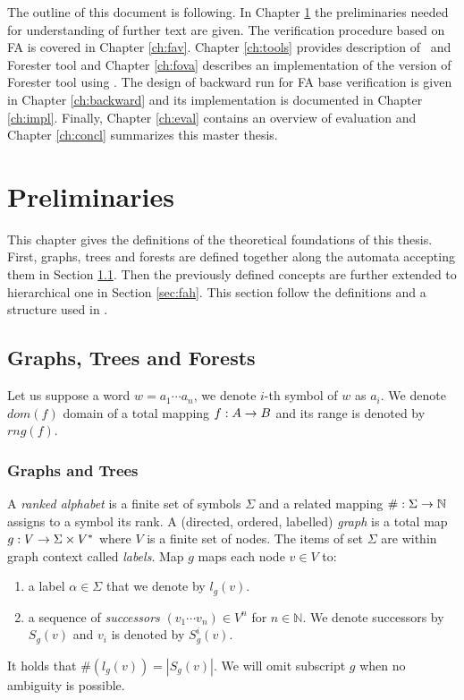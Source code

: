 The outline of this document is following.
In Chapter \ref{ch:prel} the preliminaries needed for understanding of further text are given.
The verification procedure based on FA is covered in Chapter \ref{ch:fav}.
Chapter \ref{ch:tools} provides description of \vata\ and Forester tool and Chapter \ref{ch:fova} describes an implementation of the version of Forester tool using \vata.
The design of backward run for FA base verification is given in Chapter \ref{ch:backward} and its implementation is documented
in Chapter \ref{ch:impl}.
Finally, Chapter \ref{ch:eval} contains an overview of evaluation and Chapter \ref{ch:concl} summarizes this master thesis.

\chapter{Preliminaries}
\label{ch:prel}

This chapter gives the definitions of the theoretical foundations of this thesis.
First, graphs, trees and forests are defined together along the automata accepting them in Section \ref{sec:graph}.
Then the previously defined concepts are further extended to hierarchical one in Section \ref{sec:fah}.
This section follow the definitions and a structure used in \cite{techrep}.

\section{Graphs, Trees and Forests}
\label{sec:graph}

Let us suppose a word $w = a_1 \cdots a_n$, we denote $i$-th symbol of $w$ as $a_i$.
We denote $dom(f)$ domain of a total mapping $f: A \rightarrow B$ and its range is denoted by $rng(f)$.

\subsection{Graphs and Trees}
\label{subsec:graph}
A \emph{ranked alphabet} is a finite set of symbols $\Sigma$ and a related mapping $\#: \Sigma \rightarrow \mathbb{N}$
assigns to a symbol its rank.
A (directed, ordered, labelled) \emph{graph} is a total map $g: V \rightarrow \Sigma \times V^{*}$ where $V$ is a finite set of nodes.
The items of set $\Sigma$ are within graph context called \emph{labels}.
Map $g$ maps each node $v\in V$ to:
\begin{enumerate}
	\item a label $\alpha \in \Sigma$ that we denote by $l_g(v)$.
	\item a sequence of \emph{successors} $(v_1 \cdots v_n) \in V^n$ for $n \in \mathbb{N}$.
		We denote successors by $S_g(v)$ and $v_i$ is denoted by $S^i_g(v)$.
\end{enumerate}
It holds that $\#(l_g(v)) = |S_g(v)|$.
We will omit subscript $g$ when no ambiguity is possible.

